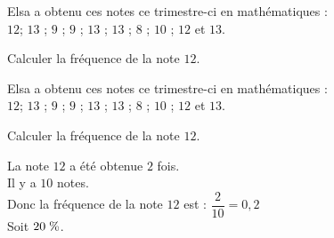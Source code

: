 \begin{exercice*}[Notes]
    Elsa a obtenu ces notes ce trimestre-ci en mathématiques :\\
    $12$; $13$ ; $9$ ; $9$ ; $13$ ; $13$ ; $8$ ; $10$ ; $12$ et $13$.
    
    \medskip
    Calculer la fréquence de la note $12$.

\end{exercice*}
\begin{corrige}
    Elsa a obtenu ces notes ce trimestre-ci en mathématiques :\\
    $12$; $13$ ; $9$ ; $9$ ; $13$ ; $13$ ; $8$ ; $10$ ; $12$ et $13$.
    
    \medskip
    Calculer la fréquence de la note $12$.
    
    {\red    
        La note $12$ a été obtenue $2$ fois.\\
         Il y a $10$ notes.\\
        Donc la fréquence de la note $12$ est : $\dfrac{2}{10}$$=0{,}2$\\
        Soit $20\thickspace\%$.    
    }
\end{corrige}

